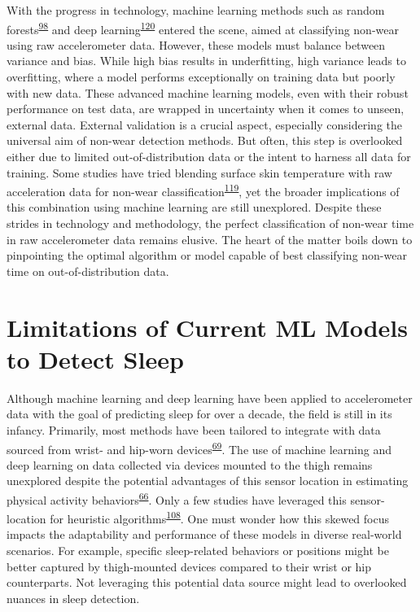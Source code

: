 \documentclass[
  10pt,
]{scrbook}
\begin{document}
With the progress in technology, machine learning methods such as random
forests\textsuperscript{\protect\hyperlink{ref-sundararajan_sleep_2021}{98}}
and deep
learning\textsuperscript{\protect\hyperlink{ref-syed_novel_2021}{120}}
entered the scene, aimed at classifying non-wear using raw accelerometer
data. However, these models must balance between variance and bias.
While high bias results in underfitting, high variance leads to
overfitting, where a model performs exceptionally on training data but
poorly with new data. These advanced machine learning models, even with
their robust performance on test data, are wrapped in uncertainty when
it comes to unseen, external data. External validation is a crucial
aspect, especially considering the universal aim of non-wear detection
methods. But often, this step is overlooked either due to limited
out-of-distribution data or the intent to harness all data for training.
Some studies have tried blending surface skin temperature with raw
acceleration data for non-wear
classification\textsuperscript{\protect\hyperlink{ref-zhou_classification_2015}{119}},
yet the broader implications of this combination using machine learning
are still unexplored. Despite these strides in technology and
methodology, the perfect classification of non-wear time in raw
accelerometer data remains elusive. The heart of the matter boils down
to pinpointing the optimal algorithm or model capable of best
classifying non-wear time on out-of-distribution data.

\hypertarget{limitations-of-current-ml-models-to-detect-sleep}{%
\section{Limitations of Current ML Models to Detect
Sleep}\label{limitations-of-current-ml-models-to-detect-sleep}}

Although machine learning and deep learning have been applied to
accelerometer data with the goal of predicting sleep for over a decade,
the field is still in its infancy. Primarily, most methods have been
tailored to integrate with data sourced from wrist- and hip-worn
devices\textsuperscript{\protect\hyperlink{ref-conley_agreement_2019}{69}}.
The use of machine learning and deep learning on data collected via
devices mounted to the thigh remains unexplored despite the potential
advantages of this sensor location in estimating physical activity
behaviors\textsuperscript{\protect\hyperlink{ref-bruxf8nd_2020}{66}}.
Only a few studies have leveraged this sensor-location for heuristic
algorithms\textsuperscript{\protect\hyperlink{ref-winkler_identifying_2016}{108}}.
One must wonder how this skewed focus impacts the adaptability and
performance of these models in diverse real-world scenarios. For
example, specific sleep-related behaviors or positions might be better
captured by thigh-mounted devices compared to their wrist or hip
counterparts. Not leveraging this potential data source might lead to
overlooked nuances in sleep detection.
\end{document}
